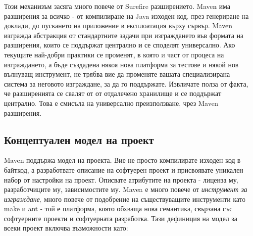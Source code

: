 Този механизъм засяга много повече от Surefire разширението. Maven има
разширения за всичко - от компилиране на Java изходен код, през
генериране на доклади, до пускането на приложение в експлоатация върху
сървър. Maven изгражда абстракция от стандартните задачи при
изграждането във формата на разширения, които се поддържат централно и
се споделят универсално. Ако текущите най-добри практики се променят,
в която и част от процеса на изграждането, а бъде създадена някоя нова
платформа за тестове и някой нов вълнуващ инструмент, не трябва вие да
променяте вашата специализирана система за неговото изграждане, за да
го поддържате. Извличате полза от факта, че разширенията се свалят от
от отдалечено хранилище и се поддържат централно. Това е смисъла на
универсално преизползване, чрез Maven разширения.   
\subsection{Концептуален модел на проект}
Maven поддържа модел на проекта. Вие не просто компилирате изходен код
в байткод, а разработвате описание на софтуерен проект и присвоявате
уникален набор от настройки на проект. Описвате атрибутите на проекта
- лиценза му, разработчиците му, зависимостите му. Maven е много
повече от \emph{инструмент за изграждане}, много повече от подобрение
на съществуващите инструменти като make и ant - той е платформа, която
обхваща нова семантика, свързана със софтуерните проекти и софтуерната
разработка. Тази дефиниция на модел за всеки проект включва
възможности като:
